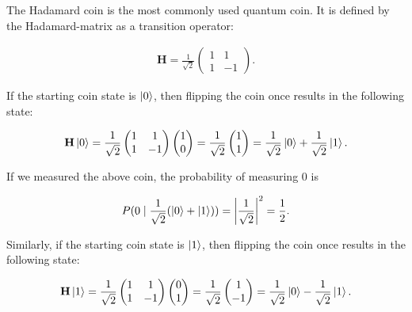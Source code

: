 The Hadamard coin is the most commonly used quantum coin. It is defined by the Hadamard-matrix as a transition operator:

\begin{align*}
  \mathbf{H} = \frac{1}{\sqrt{2}}\begin{pmatrix}
      1 & 1  \\
      1 & -1
    \end{pmatrix}.
\end{align*}

If the starting coin state is $\ket{0}$, then flipping the coin once results in the following state:

\begin{align*}
 \mathbf{H}\ket{0} = \frac{1}{\sqrt{2}}\begin{pmatrix}
      1 & 1  \\
      1 & -1
    \end{pmatrix} \begin{pmatrix} 1 \\ 0 \end{pmatrix}
    = \frac{1}{\sqrt{2}} \begin{pmatrix} 1 \\ 1 \end{pmatrix} = \frac{1}{\sqrt{2}} \ket{0} + \frac{1}{\sqrt{2}} \ket{1}.
\end{align*}

If we measured the above coin, the probability of measuring $0$ is

\begin{align*}
P(0 \mid \frac{1}{\sqrt{2}} (\ket{0} + \ket{1})) =
\left\lvert\frac{1}{\sqrt{2}}\right\rvert^2 =
\frac{1}{2}.
\end{align*}

Similarly, if the starting coin state is $\ket{1}$, then flipping the coin once results in the following state:

\begin{align*}
   \mathbf{H}\ket{1} = \frac{1}{\sqrt{2}}\begin{pmatrix}
      1 & 1  \\
      1 & -1
    \end{pmatrix} \begin{pmatrix} 0 \\ 1 \end{pmatrix}
    = \frac{1}{\sqrt{2}} \begin{pmatrix} 1 \\ -1 \end{pmatrix} = \frac{1}{\sqrt{2}} \ket{0} - \frac{1}{\sqrt{2}} \ket{1}.
\end{align*}

